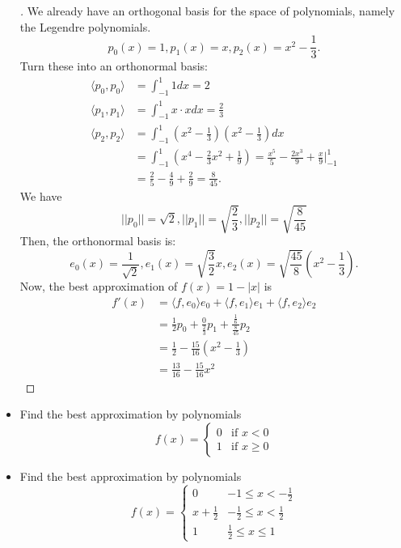 \documentclass[11pt]{article}
\begin{document}
\begin{itemize}
        \begin{proof}[\unskip\nopunct]
            We already have an orthogonal basis for the space of polynomials, namely the Legendre polynomials. \[p_0(x) = 1, p_1(x) = x, p_2(x) = x^2 - \frac{1}{3}.\] Turn these into an orthonormal basis:
            \begin{align*}
                \langle p_0, p_0 \rangle &= \int_{-1}^{1} 1 dx = 2 \\
                \langle p_1, p_1 \rangle &= \int_{-1}^{1} x \cdot x dx = \frac{2}{3} \\
                \langle p_2, p_2 \rangle &= \int_{-1}^{1} \left(x^2 - \frac{1}{3}\right) \left(x^2 - \frac{1}{3}\right) dx \\
                &= \int_{-1}^{1} \left(x^4 - \frac{2}{3} x^2 + \frac{1}{9}\right) = \frac{x^5}{5} - \frac{2x^3}{9} + \frac{x}{9} \bigg|_{-1}^{1} \\
                &= \frac{2}{5} - \frac{4}{9} + \frac{2}{9} = \frac{8}{45}.
            \end{align*}
            We have \[||p_0|| = \sqrt{2}, ||p_1|| = \sqrt{\frac{2}{3}}, ||p_2|| = \sqrt{\frac{8}{45}}\] Then, the orthonormal basis is: \[e_0 (x) = \frac{1}{\sqrt{2}}, e_1(x) = \sqrt{\frac{3}{2}} x, e_2 (x) = \sqrt{\frac{45}{8}} \left(x^2 - \frac{1}{3}\right).\] Now, the best approximation of \(f(x) = 1 - |x|\) is 
            \begin{align*}
                f'(x) &= \langle f, e_0 \rangle e_0 + \langle f, e_1 \rangle e_1 + \langle f, e_2 \rangle e_2 \\
                      &= \frac{1}{2} p_0 + \frac{0}{\frac{2}{3}} p_1 + \frac{\frac{1}{6}}{\frac{8}{45}} p_2 \\
                      &= \frac{1}{2} - \frac{15}{16} \left(x^2 - \frac{1}{3}\right) \\
                      &= \frac{13}{16} - \frac{15}{16} x^2
            \end{align*}
        \end{proof}

        \item Find the best approximation by polynomials \[f(x) = \begin{cases}
            0 & \text{if } x < 0  \\
            1 & \text{if } x \geq 0
        \end{cases}\]

        \item Find the best approximation by polynomials \[f(x) = \begin{cases}
            0 & -1 \leq x < - \frac{1}{2} \\
            x + \frac{1}{2} & - \frac{1}{2} \leq x < \frac{1}{2} \\
            1 & \frac{1}{2} \leq x \leq 1
        \end{cases}\]
    \end{itemize}
\end{document}
